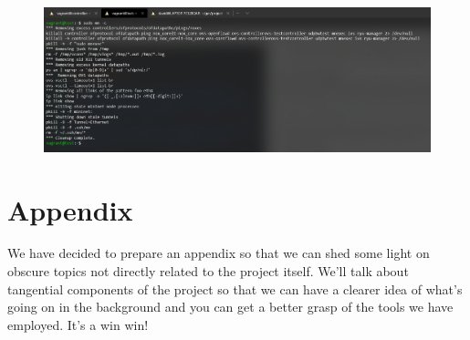 \documentclass[12pt]{article}
\begin{document}
	\begin{figure}[!htb]
		\centering
		\includegraphics[width=\linewidth]{mn_clean.png}
		\label{f:mn_clean}
	\end{figure}

\newpage

\section{Appendix}
	We have decided to prepare an appendix so that we can shed some light on obscure topics not directly related to the project itself. We'll talk about tangential components of the project so that we can have a clearer idea of what's going on in the background and you can get a better grasp of the tools we have employed. It's a win win!
\end{document}
